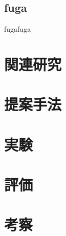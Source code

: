 \documentclass[a4j,10pt]{jsarticle}
\begin{document}
\subsection{fuga}
fugafuga

\section{関連研究}

\section{提案手法}
\section{実験}
\section{評価}

\section{考察}



\end{document}
